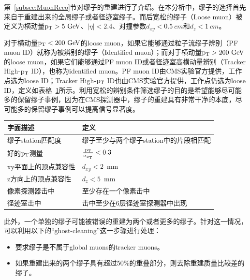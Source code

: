 第~\ref{subsec:MuonReco}节对缪子的重建进行了介绍。在本分析中，缪子的选择首先来自于重建出来的全局缪子或者径迹室缪子。而后宽松的缪子（Loose muon）被定义为横动量$\pt>5\GeV$、$|\eta|<2.4$、对撞参数$d_{xy}<0.5~\si{cm}$和$d_{z}<1~\si{cm}$。

对于横动量$\pt<200\GeV$的loose muon，如果它能够通过粒子流缪子辨别（PF muon ID）就称为被辨别的缪子（Identified muon）；而对于横动量$\pt>200\GeV$的loose muon，如果它们能够通过PF muon ID或者径迹室高横动量辨别（Tracker High-$\mathrm{p_{T}}$ ID），也称为identified muon。PF muon ID由CMS实验官方提供，工作点选为loose ID；Tracker High-$\mathrm{p_{T}}$ ID也由CMS实验官方提供，工作点仍选为loose ID，定义如表格~\ref{tab:highPtID}所示。利用宽松的辨别条件筛选缪子的目的是希望能够尽可能多的保留缪子事例，因为在CMS探测器中，缪子的重建具有非常干净的本底，尽可能多的保留缪子事例可以提高信号显著度。

\begin{table}[h]
    \begin{small}
    \begin{center}
    \begin{tabular}{ll}
      \hline
      字面描述         & 定义                 \\
      \hline
      缪子station匹配度          & 缪子至少与两个缪子station中的片段相匹配 \\
      \hline                                                          
      好的$\mathrm{p_{T}}$测量         & $\frac{\mathrm{p_{T}}}{\sigma_{\mathrm{p_{T}}}} < 0.3$      \\
      \hline
      xy平面上的顶点兼容性   & $d_{xy} < 2$~mm                       \\
      \hline
      z方向上的顶点兼容性     & $d_{z} < 5$~mm                        \\
      \hline
      像素探测器击中          & 至少存在一个像素击中           \\
      \hline
      径迹室击中       & 击中至少在6层径迹室探测器中出现  \\
      \hline
    \end{tabular}
    \label{tab:highPtID}
    \end{center}
    \end{small}
\end{table}

此外，一个单独的缪子可能被错误的重建为两个或者更多的缪子。针对这一情况，可以利用以下的“ghost-cleaning”这一步骤进行处理：
\begin{itemize}
    \item 要求缪子是不属于global muons的tracker muons。
    \item 如果重建出来的两个缪子具有超过50\%的重叠部分，则去除重建质量比较差的缪子。
\end{itemize}

